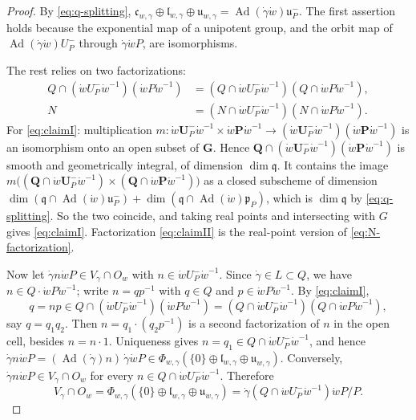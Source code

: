 \documentclass[a4paper,12pt]{amsart}
\numberwithin{equation}{section}
\theoremstyle{definition}
\theoremstyle{remark}
\newcommand{\G}{\mathbf G}
\newcommand{\Q}{\mathbf Q}
\newcommand{\pP}{\mathbf P}
\newcommand{\U}{\mathbf U}
\newcommand{\fq}{\mathfrak q}
\newcommand{\fp}{\mathfrak p}
\newcommand{\fl}{\mathfrak l}
\newcommand{\fu}{\mathfrak u}
\newcommand{\fc}{\mathfrak c}
\newcommand{\Ad}{\operatorname{Ad}}
\begin{document}
\begin{proof}
By \eqref{eq:q-splitting}, $\fc_{w,\gamma}\oplus\fl_{w,\gamma}\oplus\fu_{w,\gamma}=\Ad(\dot\gamma\dot w)\mathfrak u_P^-$. The first assertion holds because the exponential map of a unipotent group, and the orbit map of $\Ad(\dot\gamma\dot w)U_P^-$ through $\dot\gamma\dot wP$, are isomorphisms.

The rest relies on two factorizations:
\begin{align}
 Q\cap(\dot wU_P^-\dot w^{-1})(\dot wP\dot w^{-1})&=(Q\cap\dot wU_P^-\dot w^{-1})(Q\cap\dot wP\dot w^{-1}),\label{eq:claimI}\\
 N&=(N\cap\dot wU_P^-\dot w^{-1})(N\cap\dot wP\dot w^{-1}).\label{eq:claimII}
\end{align}
For \eqref{eq:claimI}: multiplication $m:\dot w\U_P^-\dot w^{-1}\times\dot w\pP\dot w^{-1}\to(\dot w\U_P^-\dot w^{-1})(\dot w\pP\dot w^{-1})$ is an isomorphism onto an open subset of $\G$. Hence $\Q\cap(\dot w\U_P^-\dot w^{-1})(\dot w\pP\dot w^{-1})$ is smooth and geometrically integral, of dimension $\dim\fq$. It contains the image $m\bigl((\Q\cap\dot w\U_P^-\dot w^{-1})\times(\Q\cap\dot w\pP\dot w^{-1})\bigr)$ as a closed subscheme of dimension $\dim(\fq\cap\Ad(\dot w)\mathfrak u_P^-)+\dim(\fq\cap\Ad(\dot w)\fp_P)$, which is $\dim\fq$ by \eqref{eq:q-splitting}. So the two coincide, and taking real points and intersecting with $G$ gives \eqref{eq:claimI}.
Factorization \eqref{eq:claimII} is the real-point version of \eqref{eq:N-factorization}.

Now let $\dot\gamma n\dot wP\in V_\gamma\cap O_w$ with $n\in\dot wU_P^-\dot w^{-1}$. Since $\dot\gamma\in L\subset Q$, we have $n\in Q\cdot\dot wP\dot w^{-1}$; write $n=qp^{-1}$ with $q\in Q$ and $p\in\dot wP\dot w^{-1}$. By \eqref{eq:claimI},
\[
 q=np\in Q\cap(\dot wU_P^-\dot w^{-1})(\dot wP\dot w^{-1})=(Q\cap\dot wU_P^-\dot w^{-1})(Q\cap\dot wP\dot w^{-1}),
\]
say $q=q_1q_2$. Then $n=q_1\cdot(q_2p^{-1})$ is a second factorization of $n$ in the open cell, besides $n=n\cdot1$. Uniqueness gives $n=q_1\in Q\cap\dot wU_P^-\dot w^{-1}$, and hence $\dot\gamma n\dot wP=(\Ad(\dot\gamma)n)\,\dot\gamma\dot wP\in\Phi_{w,\gamma}(\{0\}\oplus\fl_{w,\gamma}\oplus\fu_{w,\gamma})$. Conversely, $\dot\gamma n\dot wP\in V_\gamma\cap O_w$ for every $n\in Q\cap\dot wU_P^-\dot w^{-1}$. Therefore
\[
 V_\gamma\cap O_w=\Phi_{w,\gamma}(\{0\}\oplus\fl_{w,\gamma}\oplus\fu_{w,\gamma})=\dot\gamma(Q\cap\dot wU_P^-\dot w^{-1})\dot wP/P.
\]


\end{proof}
\end{document}
